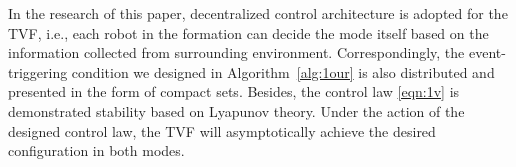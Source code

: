 \begin{remark}
In the research of this paper, decentralized control architecture is adopted for the TVF, i.e., each robot in the formation can decide the mode itself based on the information collected from surrounding environment. Correspondingly, the event-triggering condition we designed in Algorithm~\ref{alg:1our} is also distributed and presented in the form of compact sets. Besides, the control law \eqref{eqn:1v} is demonstrated stability based on Lyapunov theory. Under the action of the designed control law, the TVF will asymptotically achieve the desired configuration in both modes.
\end{remark}